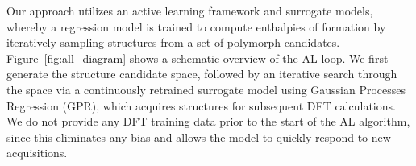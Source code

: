 %
%
%
%



%
%
Our approach utilizes an active learning framework and surrogate models,
whereby a regression model is trained to compute enthalpies of formation by iteratively sampling structures from a set of polymorph candidates.
%
Figure~\ref{fig:all_diagram} shows a schematic overview of the AL loop.
%
We first generate the structure candidate space, followed by an iterative search through the space via a continuously retrained surrogate model using Gaussian Processes Regression (GPR),
which acquires structures for subsequent DFT calculations. %
%
We do not provide any DFT training data prior to the start of the AL algorithm, since this eliminates any bias and allows the model to quickly respond to new acquisitions.


